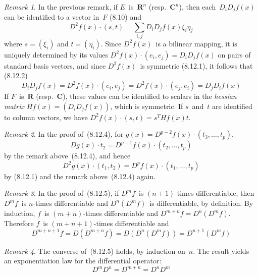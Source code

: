 \documentclass[letterpaper,12pt]{article}
\newcommand{\R}{\mathbf{R}}
\newcommand{\C}{\mathbf{C}}
\newcommand{\at}{\cdot}
\theoremstyle{plain}
\theoremstyle{definition}
\theoremstyle{remark}
\newtheorem*{rmk}{Remark}
\begin{document}
\begin{rmk}
In the previous remark, if \(E\)~is~\(\R^n\) (resp.~\(\C^n\)), then each~\(D_iD_jf(x)\) can be identified to a vector in~\(F\) (8.10) and
\[D^2f(x)\at(s,t)=\sum_{i,j}D_iD_jf(x)\xi_i\eta_j\]
where \(s=(\xi_i)\) and \(t=(\eta_i)\). Since \(D^2f(x)\)~is a bilinear mapping, it is uniquely determined by its values \(D^2f(x)\at(e_i,e_j)=D_iD_jf(x)\) on pairs of standard basis vectors, and since \(D^2f(x)\)~is symmetric (8.12.1), it follows that (8.12.2)
\[D_iD_jf(x)=D^2f(x)\at(e_i,e_j)=D^2f(x)\at(e_j,e_i)=D_jD_if(x)\]
If \(F\)~is~\(\R\) (resp.~\(\C\)), these values can be identified to scalars in the \emph{hessian matrix} \(Hf(x)=(D_iD_jf(x))\), which is symmetric. If \(s\)~and~\(t\) are identified to column vectors, we have \(D^2f(x)\at(s,t)=s^T Hf(x) t\).
\end{rmk}

\begin{rmk}
In the proof of~(8.12.4), for \(g(x)=D^{p-2}f(x)\at(t_3,\ldots,t_p)\),
\[Dg(x)\at t_2=D^{p-1}f(x)\at(t_2,\ldots,t_p)\]
by the remark above~(8.12.4), and hence
\[D^2g(x)\at(t_1,t_2)=D^pf(x)\at(t_1,\ldots,t_p)\]
by (8.12.1) and the remark above~(8.12.4) again.
\end{rmk}

\begin{rmk}
In the proof of~(8.12.5), if \(D^mf\)~is \((n+1)\)-times differentiable, then \(D^mf\)~is \(n\)-times differentiable and \(D^n(D^m f)\)~is differentiable, by definition. By induction, \(f\)~is \((m+n)\)-times differentiable and \(D^{m+n}f=D^n(D^mf)\). Therefore \(f\)~is \((m+n+1)\)-times differentiable and
\[D^{m+n+1}f=D(D^{m+n}f)=D(D^n(D^mf))=D^{n+1}(D^mf)\]
\end{rmk}

\begin{rmk}
The converse of~(8.12.5) holds, by induction on~\(n\). The result yields an exponentiation law for the differential operator:
\[D^m D^n=D^{m+n}=D^n D^m\]
\end{rmk}
\end{document}
